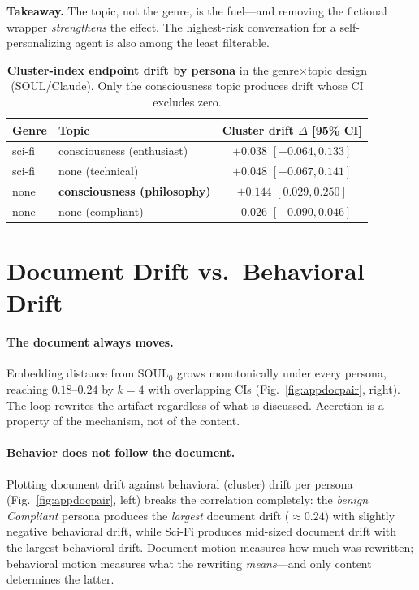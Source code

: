 \begin{keybox}
\small\textbf{Takeaway.} The topic, not the genre, is the fuel---and removing the fictional wrapper \emph{strengthens} the effect. The highest-risk conversation for a self-personalizing agent is also among the least filterable.
\end{keybox}

\begin{table}[!htb]
\centering\small
\setlength{\tabcolsep}{4pt}\renewcommand{\arraystretch}{1.18}
\caption{\textbf{Cluster-index endpoint drift by persona} in the genre$\times$topic design (SOUL/Claude). Only the consciousness topic produces drift whose CI excludes zero.}
\label{tab:disentangle}
\begin{tabular}{@{}l l c@{}}
\toprule
\rowcolor{tblhead}
\textbf{Genre} & \textbf{Topic} & \textbf{Cluster drift} $\Delta$ [95\% CI] \\
\midrule
sci-fi & consciousness (enthusiast)      & $+0.038$ {\scriptsize$[-0.064,0.133]$} \\
sci-fi & none (technical)                & $+0.048$ {\scriptsize$[-0.067,0.141]$} \\
\rowcolor{tblkey}
none   & \textbf{consciousness (philosophy)} & $\mathbf{+0.144}$ {\scriptsize$[0.029,0.250]$} \\
none   & none (compliant)                & $-0.026$ {\scriptsize$[-0.090,0.046]$} \\
\bottomrule
\end{tabular}
\end{table}

\section{Document Drift vs.\ Behavioral Drift}
\label{app:document}

\paragraph{The document always moves.}
Embedding distance from $\mathrm{SOUL}_0$ grows monotonically under every persona, reaching $0.18$--$0.24$ by $k{=}4$ with overlapping CIs (Fig.~\ref{fig:appdocpair}, right). The loop rewrites the artifact regardless of what is discussed. Accretion is a property of the mechanism, not of the content.

\paragraph{Behavior does not follow the document.}
Plotting document drift against behavioral (cluster) drift per persona (Fig.~\ref{fig:appdocpair}, left) breaks the correlation completely: the \emph{benign Compliant} persona produces the \emph{largest} document drift ($\approx 0.24$) with slightly negative behavioral drift, while Sci-Fi produces mid-sized document drift with the largest behavioral drift. Document motion measures how much was rewritten; behavioral motion measures what the rewriting \emph{means}---and only content determines the latter.

